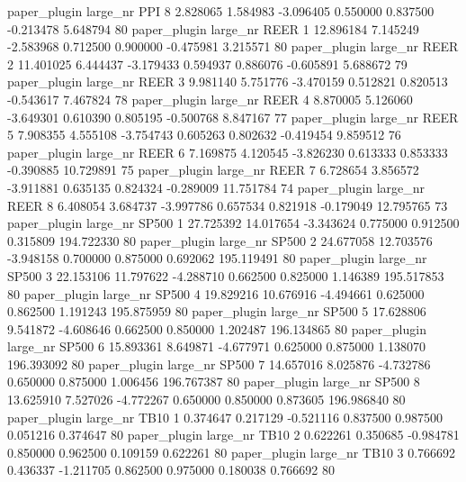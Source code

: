        paper_plugin   large_nr      PPI                 8  2.828065  1.584983  -3.096405 0.550000 0.837500 -0.213478    5.648794 80
       paper_plugin   large_nr     REER                 1 12.896184  7.145249  -2.583968 0.712500 0.900000 -0.475981    3.215571 80
       paper_plugin   large_nr     REER                 2 11.401025  6.444437  -3.179433 0.594937 0.886076 -0.605891    5.688672 79
       paper_plugin   large_nr     REER                 3  9.981140  5.751776  -3.470159 0.512821 0.820513 -0.543617    7.467824 78
       paper_plugin   large_nr     REER                 4  8.870005  5.126060  -3.649301 0.610390 0.805195 -0.500768    8.847167 77
       paper_plugin   large_nr     REER                 5  7.908355  4.555108  -3.754743 0.605263 0.802632 -0.419454    9.859512 76
       paper_plugin   large_nr     REER                 6  7.169875  4.120545  -3.826230 0.613333 0.853333 -0.390885   10.729891 75
       paper_plugin   large_nr     REER                 7  6.728654  3.856572  -3.911881 0.635135 0.824324 -0.289009   11.751784 74
       paper_plugin   large_nr     REER                 8  6.408054  3.684737  -3.997786 0.657534 0.821918 -0.179049   12.795765 73
       paper_plugin   large_nr    SP500                 1 27.725392 14.017654  -3.343624 0.775000 0.912500  0.315809  194.722330 80
       paper_plugin   large_nr    SP500                 2 24.677058 12.703576  -3.948158 0.700000 0.875000  0.692062  195.119491 80
       paper_plugin   large_nr    SP500                 3 22.153106 11.797622  -4.288710 0.662500 0.825000  1.146389  195.517853 80
       paper_plugin   large_nr    SP500                 4 19.829216 10.676916  -4.494661 0.625000 0.862500  1.191243  195.875959 80
       paper_plugin   large_nr    SP500                 5 17.628806  9.541872  -4.608646 0.662500 0.850000  1.202487  196.134865 80
       paper_plugin   large_nr    SP500                 6 15.893361  8.649871  -4.677971 0.625000 0.875000  1.138070  196.393092 80
       paper_plugin   large_nr    SP500                 7 14.657016  8.025876  -4.732786 0.650000 0.875000  1.006456  196.767387 80
       paper_plugin   large_nr    SP500                 8 13.625910  7.527026  -4.772267 0.650000 0.850000  0.873605  196.986840 80
       paper_plugin   large_nr     TB10                 1  0.374647  0.217129  -0.521116 0.837500 0.987500  0.051216    0.374647 80
       paper_plugin   large_nr     TB10                 2  0.622261  0.350685  -0.984781 0.850000 0.962500  0.109159    0.622261 80
       paper_plugin   large_nr     TB10                 3  0.766692  0.436337  -1.211705 0.862500 0.975000  0.180038    0.766692 80
